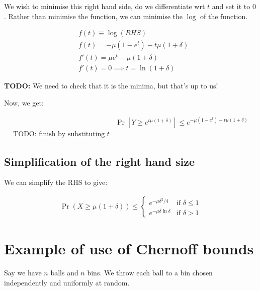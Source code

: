 We wish to minimise this right hand side, do we differentiate wrt $t$ and set
it to $0$.  Rather than minimise the function, we can minimise the $\log$ of
the function.

\begin{align*}
&f(t) \equiv \log (RHS) \\
&f(t) = -\mu(1 - e^t) - t\mu (1 + \delta) \\
& f'(t) = \mu e^t - \mu(1 + \delta) \\
& f'(t) = 0 \implies t = \ln (1 + \delta)
\end{align*}

\textbf{TODO:} We need to check that it is the minima, but that's up to us!

Now, we get:

\begin{align*}
&\Pr[Y \geq e^{t \mu (1 + \delta)}] \leq e^{-\mu (1 - e^t) - t\mu(1 + \delta)} \\
\text{TODO: finish by substituting $t$}
\end{align*}

\subsection{Simplification of the right hand size}

We can simplify the RHS to give:

\begin{align*}
\Pr(X \geq \mu(1 + \delta)) \leq
\begin{cases}
e^{-\mu \delta^2 / 4} & \text{if~$\delta \leq 1$} \\
e^{-\mu \delta \ln \delta} & \text{if~$\delta > 1$}
\end{cases}
\end{align*}

\section{Example of use of Chernoff bounds}

Say we have $n$ balls and $n$ bins. We throw each ball to a bin chosen
independently and uniformly at random.
